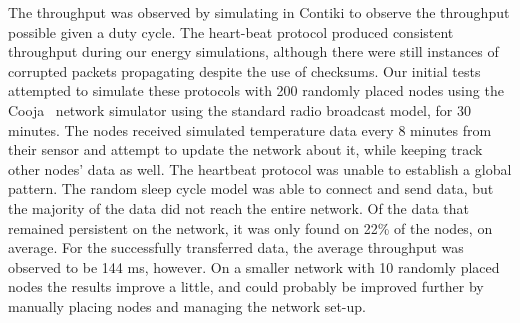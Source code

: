 The throughput was observed by simulating in Contiki to observe the throughput possible given a duty cycle.  The heart-beat
protocol produced consistent throughput during our energy simulations, although there were still instances of corrupted packets
propagating despite the use of checksums.  Our initial tests attempted to simulate these protocols with 200 randomly placed nodes using the
Cooja~\cite{cooja} network simulator using the standard radio broadcast model, for 30 minutes.  The nodes received simulated
temperature data every 8 minutes from their sensor and attempt to update the network about it, while keeping track other nodes'
data as well.  The heartbeat protocol was unable
to establish a global pattern.  The random sleep cycle model was able to connect and send data, but the majority of the data
did not reach the entire network.  Of the data that remained persistent on the network, it was only found on 22\% of the nodes,
on average.  For the successfully transferred data, the average throughput was observed to be 144 ms, however.  On a smaller
network with 10 randomly placed nodes the results improve a little, and could probably be improved further by manually placing
nodes and managing the network set-up.
